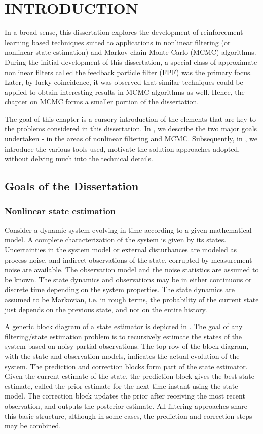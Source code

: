 \chapter{INTRODUCTION} 
\label{ch:intro}

In a broad sense, this dissertation explores the development of reinforcement learning based techniques suited to applications in nonlinear filtering (or nonlinear state estimation) and Markov chain Monte Carlo (MCMC) algorithms. During the initial development of this dissertation, a special class of approximate nonlinear filters called the feedback particle filter (FPF) was the primary focus. Later, by lucky coincidence, it was observed that similar techniques could be applied to obtain interesting results in MCMC algorithms as well. Hence, the chapter on MCMC forms a smaller portion of the dissertation. 

The goal of this chapter is a cursory introduction of the elements that are key to the problems considered in this dissertation. In , we describe the two major goals undertaken - in the areas of nonlinear filtering and MCMC. Subsequently, in , we introduce the various tools used, motivate the solution approaches adopted, without delving much into the technical details. 
\section{Goals of the Dissertation}
\label{s:goals}
\subsection{Nonlinear state estimation}
Consider a dynamic system evolving in time according to a given mathematical model. A complete characterization of the system is given by its states. Uncertainties in the system model or external disturbances are modeled as process noise, and indirect observations of the state, corrupted by measurement noise are available. The observation model and the noise statistics are assumed to be known. The state dynamics and observations may be in either continuous or discrete time depending on the system properties. The state dynamics are assumed to be Markovian, i.e. in rough terms, the probability of the current state just depends on the previous state, and not on the entire history. 

A generic block diagram of a state estimator is depicted in . The goal of any filtering/state estimation problem is to recursively estimate the states of the system based on noisy partial observations. The top row of the block diagram, with the state and observation models, indicates the actual evolution of the system. The prediction and correction blocks form part of the state estimator. Given the current estimate of the state, the prediction block gives the best state estimate, called the prior estimate for the next time instant using the state model. The correction block updates the prior after receiving the most recent observation, and outputs the posterior estimate. All filtering approaches share this basic structure, although in some cases, the prediction and correction steps may be combined.  

